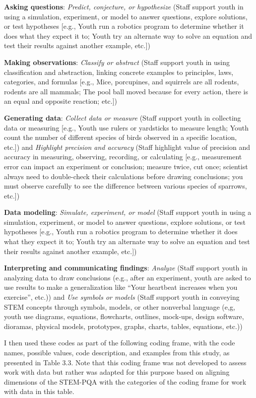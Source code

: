 \documentclass[]{book}
\theoremstyle{definition}
\theoremstyle{definition}
\theoremstyle{definition}
\theoremstyle{remark}
\begin{document}
\textbf{Asking questions}: \emph{Predict, conjecture, or hypothesize}
(Staff support youth in using a simulation, experiment, or model to
answer questions, explore solutions, or test hypotheses {[}e.g., Youth
run a robotics program to determine whether it does what they expect it
to; Youth try an alternate way to solve an equation and test their
results against another example, etc.{]})

\textbf{Making observations}: \emph{Classify or abstract} (Staff support
youth in using classification and abstraction, linking concrete examples
to principles, laws, categories, and formulas {[}e.g., Mice, porcupines,
and squirrels are all rodents, rodents are all mammals; The pool ball
moved because for every action, there is an equal and opposite reaction;
etc.{]})

\textbf{Generating data}: \emph{Collect data or measure} (Staff support
youth in collecting data or measuring {[}e.g., Youth use rulers or
yardsticks to measure length; Youth count the number of different
species of birds observed in a specific location, etc.{]}) and
\emph{Highlight precision and accuracy} (Staff highlight value of
precision and accuracy in measuring, observing, recording, or
calculating {[}e.g., measurement error can impact an experiment or
conclusion; measure twice, cut once; scientist always need to
double-check their calculations before drawing conclusions; you must
observe carefully to see the difference between various species of
sparrows, etc.{]})

\textbf{Data modeling}: \emph{Simulate, experiment, or model} (Staff
support youth in using a simulation, experiment, or model to answer
questions, explore solutions, or test hypotheses {[}e.g., Youth run a
robotics program to determine whether it does what they expect it to;
Youth try an alternate way to solve an equation and test their results
against another example, etc.{]})

\textbf{Interpreting and communicating findings}: \emph{Analyze} (Staff
support youth in analyzing data to draw conclusions (e.g., after an
experiment, youth are asked to use results to make a generalization like
``Your heartbeat increases when you exercise'', etc.)) and \emph{Use
symbols or models} (Staff support youth in conveying STEM concepts
through symbols, models, or other nonverbal language (e,g, youth use
diagrams, equations, flowcharts, outlines, mock-ups, design software,
dioramas, physical models, prototypes, graphs, charts, tables,
equations, etc.))

I then used these codes as part of the following coding frame, with the
code names, possible values, code description, and examples from this
study, as presented in Table 3.3. Note that this coding frame was not
developed to assess work with data but rather was adapted for this
purpose based on aligning dimensions of the STEM-PQA with the categories
of the coding frame for work with data in this table.
\end{document}
